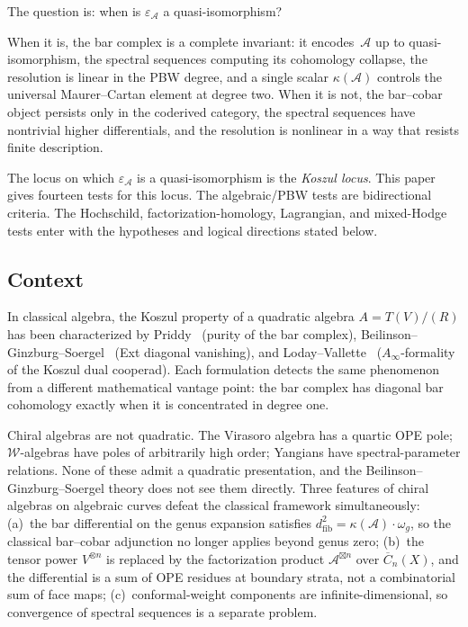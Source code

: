 \documentclass[11pt,reqno]{amsart}
\theoremstyle{definition}
\theoremstyle{remark}
\newcommand{\cA}{\mathcal{A}}
\newcommand{\cW}{\mathcal{W}}
\newcommand{\FM}{\overline{C}}
\newcommand{\Ainfty}{A_\infty}
\numberwithin{equation}{section}
\begin{document}
The question is: when is $\varepsilon_\cA$ a quasi-isomorphism?

When it is, the bar complex is a complete invariant: it encodes~$\cA$
up to quasi-isomorphism, the spectral sequences computing its
cohomology collapse, the resolution is linear in the PBW degree,
and a single scalar $\kappa(\cA)$ controls the universal
Maurer--Cartan element at degree two. When it is not, the
bar--cobar object persists only in the coderived category, the
spectral sequences have nontrivial higher differentials, and the
resolution is nonlinear in a way that resists finite description.

The locus on which $\varepsilon_\cA$ is a quasi-isomorphism is the
\emph{Koszul locus}. This paper gives fourteen tests for this locus.
The algebraic/PBW tests are bidirectional criteria. The Hochschild,
factorization-homology, Lagrangian, and mixed-Hodge tests enter with
the hypotheses and logical directions stated below.

\subsection{Context}

In classical algebra, the Koszul property of a quadratic algebra
$A = T(V)/(R)$ has been characterized by
Priddy~\cite{Priddy} (purity of the bar complex),
Beilinson--Ginzburg--Soergel~\cite{BGS} (Ext diagonal vanishing),
and Loday--Vallette~\cite{LV12} ($\Ainfty$-formality of the
Koszul dual cooperad). Each formulation detects the same
phenomenon from a different mathematical vantage point: the
bar complex has diagonal bar cohomology exactly when it is
concentrated in degree one.

Chiral algebras are not quadratic. The Virasoro algebra has a
quartic OPE pole; $\cW$-algebras have poles of
arbitrarily high order; Yangians have spectral-parameter
relations. None of these admit a quadratic presentation, and the
Beilinson--Ginzburg--Soergel theory does not see them directly.
Three features of chiral algebras on algebraic curves defeat the
classical framework simultaneously: (a)~the bar differential on
the genus expansion satisfies
$d^2_{\mathrm{fib}} = \kappa(\cA) \cdot \omega_g$, so the
classical bar--cobar adjunction no longer applies beyond genus
zero; (b)~the tensor power $V^{\otimes n}$ is replaced
by the factorization product $\cA^{\boxtimes n}$ over $\FM_n(X)$,
and the differential is a sum of OPE residues at boundary strata,
not a combinatorial sum of face maps; (c)~conformal-weight
components are infinite-dimensional, so convergence of spectral
sequences is a separate problem.
\end{document}
